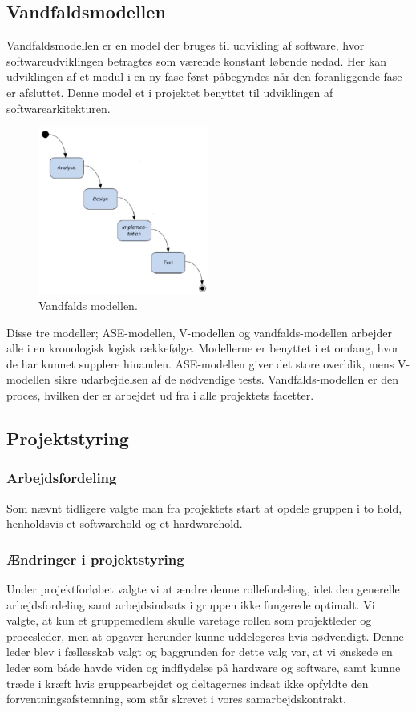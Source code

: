 \subsection{Vandfaldsmodellen}
Vandfaldsmodellen er en model der bruges til udvikling af software, hvor softwareudviklingen betragtes som værende konstant løbende nedad. Her kan udviklingen af et modul i en ny fase først påbegyndes når den foranliggende fase er afsluttet. Denne model et i projektet benyttet til udviklingen af softwarearkitekturen. 
\begin{figure}[H]
\includegraphics[width =0.5\textwidth , center]{billeder/Vandfald}
\caption{Vandfalds modellen.}
\end{figure} 
Disse tre modeller; ASE-modellen, V-modellen og vandfalds-modellen arbejder alle i en kronologisk logisk rækkefølge. Modellerne er benyttet i et omfang, hvor de har kunnet supplere hinanden. ASE-modellen giver det store overblik, mens V-modellen sikre udarbejdelsen af de nødvendige tests. Vandfalds-modellen er den proces, hvilken der er arbejdet ud fra i alle projektets facetter.   
\subsection{Projektstyring}
\subsubsection{Arbejdsfordeling}
Som nævnt tidligere valgte man fra projektets start at opdele gruppen i to hold, henholdsvis et softwarehold og et hardwarehold.
\subsubsection{Ændringer i projektstyring}
Under projektforløbet valgte vi at ændre denne rollefordeling, idet den generelle arbejdsfordeling samt arbejdsindsats i gruppen ikke fungerede optimalt. Vi valgte, at kun et gruppemedlem skulle varetage rollen som projektleder og procesleder, men at opgaver herunder kunne uddelegeres hvis nødvendigt. Denne leder blev i fællesskab valgt og baggrunden for dette valg var, at vi ønskede en leder som både havde viden og indflydelse på hardware og software, samt kunne træde i kræft hvis gruppearbejdet og deltagernes indsat ikke opfyldte den forventningsafstemning, som står skrevet i vores samarbejdskontrakt. 
